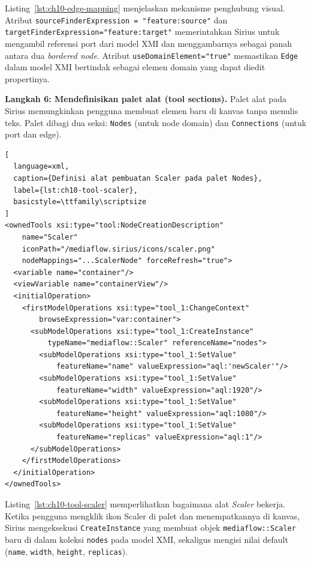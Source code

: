\noindent Listing~\ref{lst:ch10-edge-mapping} menjelaskan mekanisme penghubung visual. Atribut \texttt{sourceFinderExpression = "feature:source"} dan \texttt{targetFinderExpression="feature:target"} memerintahkan Sirius untuk mengambil referensi port dari model XMI dan menggambarnya sebagai panah antara dua \textit{bordered node}. Atribut \texttt{useDomainElement="true"} memastikan \texttt{Edge} dalam model XMI bertindak sebagai elemen domain yang dapat diedit propertinya.

\textbf{Langkah 6: Mendefinisikan palet alat (tool sections).} Palet alat pada Sirius memungkinkan pengguna membuat elemen baru di kanvas tanpa menulis teks. Palet dibagi dua seksi: \texttt{Nodes} (untuk node domain) dan \texttt{Connections} (untuk port dan edge).

\begin{lstlisting}[
  language=xml,
  caption={Definisi alat pembuatan Scaler pada palet Nodes},
  label={lst:ch10-tool-scaler},
  basicstyle=\ttfamily\scriptsize
]
<ownedTools xsi:type="tool:NodeCreationDescription"
    name="Scaler"
    iconPath="/mediaflow.sirius/icons/scaler.png"
    nodeMappings="...ScalerNode" forceRefresh="true">
  <variable name="container"/>
  <viewVariable name="containerView"/>
  <initialOperation>
    <firstModelOperations xsi:type="tool_1:ChangeContext"
        browseExpression="var:container">
      <subModelOperations xsi:type="tool_1:CreateInstance"
          typeName="mediaflow::Scaler" referenceName="nodes">
        <subModelOperations xsi:type="tool_1:SetValue"
            featureName="name" valueExpression="aql:'newScaler'"/>
        <subModelOperations xsi:type="tool_1:SetValue"
            featureName="width" valueExpression="aql:1920"/>
        <subModelOperations xsi:type="tool_1:SetValue"
            featureName="height" valueExpression="aql:1080"/>
        <subModelOperations xsi:type="tool_1:SetValue"
            featureName="replicas" valueExpression="aql:1"/>
      </subModelOperations>
    </firstModelOperations>
  </initialOperation>
</ownedTools>
\end{lstlisting}

\noindent Listing~\ref{lst:ch10-tool-scaler} memperlihatkan bagaimana alat \textit{Scaler} bekerja. Ketika pengguna mengklik ikon Scaler di palet dan menempatkannya di kanvas, Sirius mengeksekusi \texttt{CreateInstance} yang membuat objek \texttt{mediaflow::Scaler} baru di dalam koleksi \texttt{nodes} pada model XMI, sekaligus mengisi nilai default (\texttt{name}, \texttt{width}, \texttt{height}, \texttt{replicas}).

